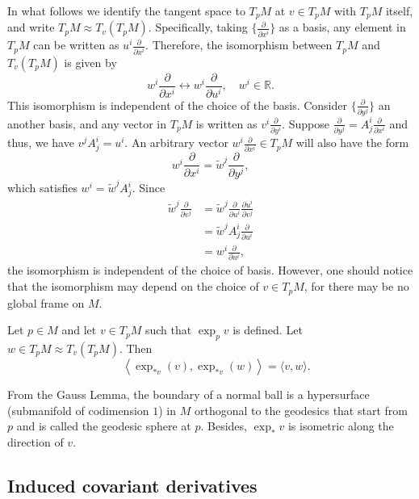 \documentclass{ctexart}
\begin{document}
In what follows we identify the tangent space to $T_p M$ at $v \in T_p M$ with $T_p M$ itself, and write $T_p M \approx T_v\left(T_p M\right)$. 
Specifically, taking $\{\frac{\partial}{\partial x^i}\}$ as a basis, any element in $T_pM$ can be written as $u^i\frac{\partial}{\partial x^i}$. Therefore, 
the isomorphism between $T_pM$ and $T_v\left(T_pM\right)$ is given by 
$$
w^i\frac{\partial}{\partial x^i}\longleftrightarrow w^i\frac{\partial}{\partial u^i}, \quad w^i\in\mathbb{R}.
$$
This isomorphism is independent of the choice of the basis. Consider $\{\frac{\partial}{\partial y^j}\}$ an another basis, and any vector in $T_pM$ is written as 
$v^i\frac{\partial}{\partial y^i}$. Suppose $\frac{\partial}{\partial y^j}=A_j^i\frac{\partial}{\partial x^i}$ and thus, we have $v^jA_j^i=u^i$.
An arbitrary vector $w^i\frac{\partial}{\partial x^i}\in T_pM$ will also have the form
$$
w^i\frac{\partial}{\partial x^i}=\tilde{w}^j\frac{\partial}{\partial y^j},
$$
which satisfies $w^i=\tilde{w}^jA_j^i$.
Since 
\begin{align*}
  \tilde{w}^j\frac{\partial}{\partial v^j}
  &= \tilde{w}^j \frac{\partial}{\partial u^i} \frac{\partial u^i}{\partial v^j} \\
  &= \tilde{w}^j A_j^i \frac{\partial}{\partial u^i} \\
  &= w^i \frac{\partial}{\partial u^i},
\end{align*}
the isomorphism is independent of the choice of basis. However, one should notice that the isomorphism may depend on the choice of $v\in T_pM$, for 
there may be no global frame on $M$.

\begin{lemma}
    Let $p \in M$ and let $v \in T_p M$ such that $\exp _p v$ is defined. Let $w \in T_p M \approx T_v\left(T_p M\right)$. Then
    $$
    \quad\left\langle\exp_{*v}(v),\exp_{*v}(w)\right\rangle=\langle v, w\rangle.
    $$
\end{lemma}
From the Gauss Lemma, the boundary of a normal ball is a hypersurface (submanifold of codimension $1$) in $M$ 
orthogonal to the geodesics that start from $p$ and is called the geodesic sphere at $p$. Besides, $\exp_*v$ is isometric along the direction of $v$. 

\subsection*{Induced covariant derivatives}
\end{document}
